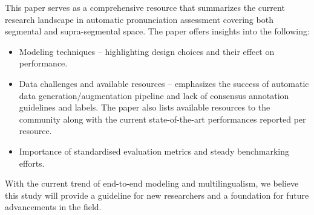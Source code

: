 \documentclass[11pt]{article}
\begin{document}
This paper serves as a comprehensive resource that summarizes the current research landscape in automatic pronunciation assessment covering both segmental and supra-segmental space. The paper offers insights into the following:
\begin{itemize} [noitemsep]
    \item Modeling techniques -- highlighting design choices and their effect on performance.
    \item Data challenges and available resources -- emphasizes the success of automatic data generation/augmentation pipeline and lack of consensus annotation guidelines and labels. The paper also lists available resources to the community along with the current state-of-the-art performances reported per resource.
    \item Importance of standardised evaluation metrics and steady benchmarking efforts.
\end{itemize}
\noindent With the current trend of end-to-end modeling and multilingualism, we believe this study will provide a guideline for new researchers and a foundation for future advancements in the field.






\end{document}
